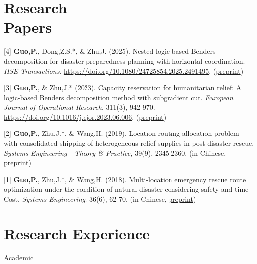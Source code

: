 \documentclass[margin]{res}
\begin{document}
\begin{resume}
\vspace{-.8em}
\section{\sc Research \\Papers}



[4] \textbf{Guo,P.}, Dong,Z.S.*, \& Zhu,J. (2025). Nested logic-based Benders decomposition for disaster preparedness planning with horizontal coordination. \textit{IISE Transactions}. \url{https://doi.org/10.1080/24725854.2025.2491495}. (\href{https://guo.ph/publication/LateralTransshipment2025.pdf}{preprint})
\vspace{-.8em}

[3] \textbf{Guo,P.}, \& Zhu,J.* (2023). Capacity reservation for humanitarian relief: A logic-based Benders decomposition method with subgradient cut. \textit{European Journal of Operational Research}, 311(3), 942-970. \url{https://doi.org/10.1016/j.ejor.2023.06.006}. (\href{https://guo.ph/publication/CapacityReservationHumanitarian2023.pdf}{preprint})
\vspace{-.8em}

[2] \textbf{Guo,P.}, Zhu,J.*, \& Wang,H. (2019). Location-routing-allocation problem with consolidated shipping of heterogeneous relief supplies in post-disaster rescue. \textit{Systems Engineering - Theory \& Practice,} 39(9), 2345-2360. (in Chinese, \href{https://guo.ph/publication/zh-LocationRoutingAllocation.pdf}{preprint})
\vspace{-.8em}

[1] \textbf{Guo,P.}, Zhu,J.*, \& Wang,H. (2018). Multi-location emergency rescue route optimization under the condition of natural disaster considering safety and time Cost. \textit{Systems Engineering,} 36(6), 62-70. (in Chinese, \href{https://guo.ph/publication/zh-RiskTime.pdf}{preprint})

\vspace{-.8em}
\section{\sc Research Experience}


{\sc Academic}
\vspace{-.8em}


\end{resume}
\end{document}
